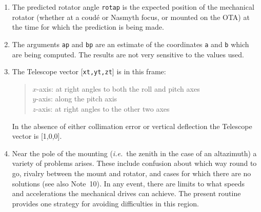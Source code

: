 \documentclass[12pt,fleqn,twoside]{article}
\renewcommand{\_}{{\tt\char'137}}     %
\newcommand{\radec}     {$[\,\alpha,\delta\,]$}
\newcommand{\hadec}     {$[\,h,\delta\,]$}
\newcommand{\azel}      {$[\,Az,El~]$}
\begin{document}
{\begin{enumerate}
\begin{tabbing}
         \> {\tt spm2   } \> geocentric \hadec\ $\Rightarrow$ {\sc Aim}
      \end{tabbing}
      \begin{tabbing}
         xxx \= xxxxxxxxxx \= \kill
         \> {\tt frame  } \> {\tt APPT\_TOPO} \\
         \> {\tt target } \> topocentric apparent \radec \\
         \> {\tt spm1   } \> identity matrix \\
         \> {\tt sst,cst} \> \radec\ $\Rightarrow$ \hadec \\
         \> {\tt spm2   } \> topocentric \hadec\ $\Rightarrow$ {\sc Aim}
      \end{tabbing}
      \begin{tabbing}
         xxx \= xxxxxxxxxx \= \kill
         \> {\tt frame  } \> {\tt AZEL\_TOPO} \\
         \> {\tt target } \> topocentric \azel\ (N thru E) \\
         \> {\tt spm1   } \> identity matrix \\
         \> {\tt sst,cst} \> not used \\
         \> {\tt spm2   } \> topocentric \azel\ $\Rightarrow$ {\sc Aim}
      \end{tabbing}

      ICRS $\approx$ FK5 J2000 to better than 25 mas.
\item The predicted rotator angle {\tt rotap} is the expected position of
      the mechanical rotator (whether at a coud\'e or Nasmyth focus,
      or mounted on the OTA) at the time for which the prediction is
      being made.
\item The arguments {\tt ap} and {\tt bp}
      are an estimate of the coordinates
      {\tt a} and {\tt b} which are being computed.  The
      results are not very
      sensitive to the values used.
\item The {\sc Telescope} vector [{\tt xt,yt,zt}] is in this frame:
      \begin{quote}
      $x$-axis:  at right angles to both the roll and pitch axes \\
      $y$-axis:  along the pitch axis \\
      $z$-axis:  at right angles to the other two axes
      \end{quote}
      In the absence of either collimation error or vertical deflection
      the {\sc Telescope} vector is [1,0,0].
\item Near the pole of the mounting ({\it i.e.}~the zenith in the case of an
      altazimuth) a variety of problems arises.  These include
      confusion about which way round to go, rivalry between the mount
      and rotator, and cases for which there are no solutions (see also
      Note~10).  In any event, there are limits to what speeds and
      accelerations the mechanical drives can achieve.  The present
      routine provides one strategy for avoiding difficulties in this
      region.


\end{enumerate}}
\end{document}
